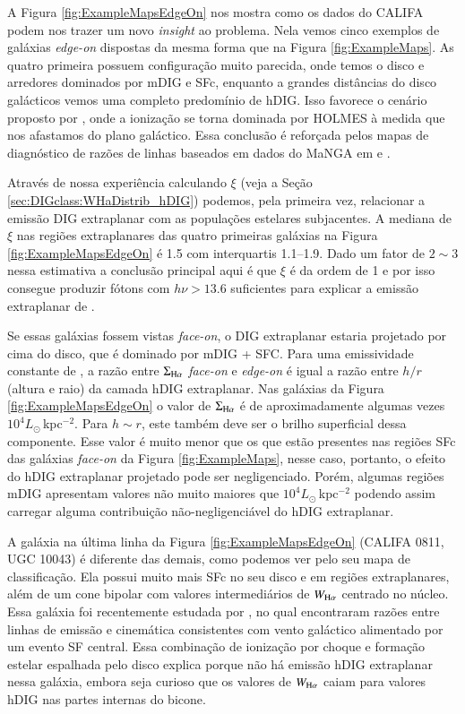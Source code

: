 A Figura \ref{fig:ExampleMapsEdgeOn} nos mostra como os dados do CALIFA podem nos trazer um novo {\em insight} ao problema. Nela vemos cinco exemplos de galáxias {\em edge-on} dispostas da mesma forma que na Figura \ref{fig:ExampleMaps}. As quatro primeira possuem configuração muito parecida, onde temos o disco e arredores dominados por mDIG e SFc, enquanto a grandes distâncias do disco galácticos vemos uma completo predomínio de hDIG. Isso favorece o cenário proposto por \citet{FloresFajardo.etal.2011a}, onde a ionização se torna dominada por HOLMES à medida que nos afastamos do plano galáctico. Essa conclusão é reforçada pelos mapas de diagnóstico de razões de linhas baseados em dados do MaNGA em \citet{Belfiore.etal.2016} e \citet{Zhang.etal.2017a}.

Através de nossa experiência calculando $\xi$ (veja a Seção \ref{sec:DIGclass:WHaDistrib_hDIG}) podemos, pela primeira vez, relacionar a emissão DIG extraplanar com as populações estelares subjacentes. A mediana de $\xi$ nas regiões extraplanares das quatro primeiras galáxias na Figura \ref{fig:ExampleMapsEdgeOn} é 1.5 com interquartis 1.1--1.9. Dado um fator de $2 \sim 3$ nessa estimativa \citep{CidFernandes.etal.2011a} a conclusão principal aqui é que $\xi$ é da ordem de 1 e por isso consegue produzir fótons com $h\nu > 13.6$ suficientes para explicar a emissão extraplanar de \Ha.

Se essas galáxias fossem vistas {\em face-on}, o DIG extraplanar estaria projetado por cima do disco, que é dominado por mDIG + SFC. Para uma emissividade constante de \Ha, a razão entre $\Sigma_{\Ha}$ {\em face-on} e {\em edge-on} é igual a razão entre $h/r$ (altura e raio) da camada hDIG extraplanar. Nas galáxias da Figura \ref{fig:ExampleMapsEdgeOn} o valor de $\Sigma_{\Ha}$ é de aproximadamente algumas vezes $10^4 L_\odot\,$kpc$^{-2}$. Para $h \sim r$, este também deve ser o brilho superficial dessa componente. Esse valor é muito menor que os que estão presentes nas regiões SFc das galáxias {\em face-on} da Figura \ref{fig:ExampleMaps}, nesse caso, portanto, o efeito do hDIG extraplanar projetado pode ser negligenciado. Porém, algumas regiões mDIG apresentam valores não muito maiores que $10^4 L_\odot\,$kpc$^{-2}$ podendo assim carregar alguma contribuição não-negligenciável do hDIG extraplanar.

A galáxia na última linha da Figura \ref{fig:ExampleMapsEdgeOn} (CALIFA 0811, UGC 10043) é diferente das demais, como podemos ver pelo seu mapa de classificação. Ela possui muito mais SFc no seu disco e em regiões extraplanares, além de um cone bipolar com valores intermediários de $W_{\Ha}$ centrado no núcleo. Essa galáxia foi recentemente estudada por \citet{LopezCoba.etal.2017}, no qual encontraram razões entre linhas de emissão e cinemática consistentes com vento galáctico alimentado por um evento SF central. Essa combinação de ionização por choque e formação estelar espalhada pelo disco explica porque não há emissão hDIG extraplanar nessa galáxia, embora seja curioso que os valores de $W_{\Ha}$ caiam para valores hDIG nas partes internas do bicone.


